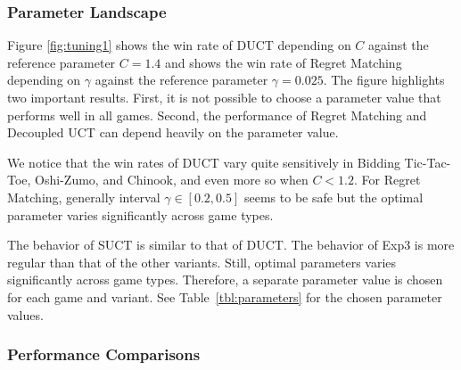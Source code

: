 \documentclass[conference]{IEEEtran}
\begin{document}
\subsubsection{Parameter Landscape}

Figure \ref{fig:tuning1} shows the win rate of DUCT depending on $C$ against the reference parameter $C=1.4$ and 
shows the win rate of Regret Matching depending on $\gamma$ against the reference parameter $\gamma = 0.025$. The figure 
highlights two important results. First, it is not possible to choose a parameter value that performs well in all games. 
Second, the performance of Regret Matching and Decoupled UCT can depend heavily on the parameter value. 

We notice that the win rates of DUCT vary quite sensitively in Bidding Tic-Tac-Toe, Oshi-Zumo, and Chinook, and even more so when $C < 1.2$. 
For Regret Matching, generally interval $\gamma \in [0.2,0.5]$ seems to be safe but the optimal parameter varies significantly across game types.

The behavior of SUCT is similar to that of DUCT. The behavior of Exp3 is more regular than that of the other variants. 
Still, optimal parameters varies significantly across game types. Therefore, a separate parameter value is chosen 
for each game and variant. See Table~\ref{tbl:parameters} for the chosen parameter values.


\subsubsection{Performance Comparisons}
\end{document}
